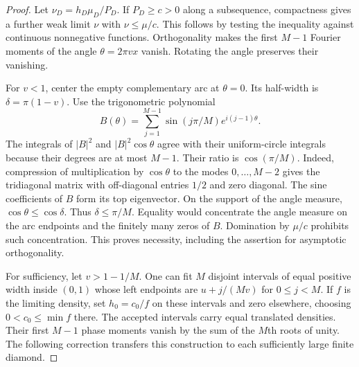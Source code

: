 \documentclass[11pt,letterpaper]{article}
\begin{document}
\begin{proof}
Let $\nu_D=h_D\mu_D/P_D$. If $P_D\ge c>0$ along a subsequence, compactness gives a further weak limit $\nu$ with $\nu\leq\mu/c$. This follows by testing the inequality against continuous nonnegative functions. Orthogonality makes the first $M-1$ Fourier moments of the angle $\theta=2\pi v x$ vanish. Rotating the angle preserves their vanishing.

For $v<1$, center the empty complementary arc at $\theta=0$. Its half-width is $\delta=\pi(1-v)$. Use the trigonometric polynomial
\[
 B(\theta)=\sum_{j=1}^{M-1}\sin(j\pi/M)e^{i(j-1)\theta}.
\]
The integrals of $|B|^2$ and $|B|^2\cos\theta$ agree with their uniform-circle integrals because their degrees are at most $M-1$. Their ratio is $\cos(\pi/M)$. Indeed, compression of multiplication by $\cos\theta$ to the modes $0,\ldots,M-2$ gives the tridiagonal matrix with off-diagonal entries $1/2$ and zero diagonal. The sine coefficients of $B$ form its top eigenvector. On the support of the angle measure, $\cos\theta\leq\cos\delta$. Thus $\delta\leq\pi/M$. Equality would concentrate the angle measure on the arc endpoints and the finitely many zeros of $B$. Domination by $\mu/c$ prohibits such concentration. This proves necessity, including the assertion for asymptotic orthogonality.

For sufficiency, let $v>1-1/M$. One can fit $M$ disjoint intervals of equal positive width inside $(0,1)$ whose left endpoints are $u+j/(Mv)$ for $0\leq j<M$. If $f$ is the limiting density, set $h_0=c_0/f$ on these intervals and zero elsewhere, choosing $0<c_0\leq\min f$ there. The accepted intervals carry equal translated densities. Their first $M-1$ phase moments vanish by the sum of the $M$th roots of unity. The following correction transfers this construction to each sufficiently large finite diamond.
\end{proof}
\end{document}

